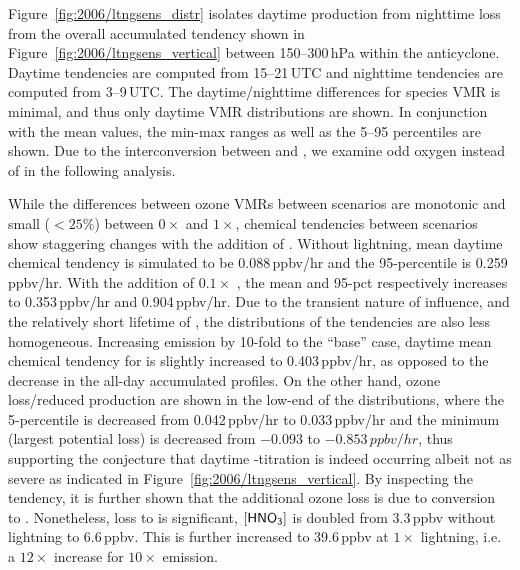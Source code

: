 Figure~\ref{fig:2006/ltngsens_distr} isolates daytime production from nighttime loss from the overall accumulated tendency shown
in Figure~\ref{fig:2006/ltngsens_vertical} between 150--300\,\unit{hPa} within the anticyclone. Daytime tendencies are computed
from 15--21\,\unit{UTC} and nighttime tendencies are computed from 3--9\,\unit{UTC}. The daytime/nighttime differences for species
VMR is minimal, and thus only daytime VMR distributions are shown. In conjunction with the mean values, the min-max ranges as well as the
5--95 percentiles are shown. Due to the interconversion between  and , we examine odd oxygen
 instead of  in the following analysis.

While the differences between ozone VMRs between scenarios are monotonic and small ($<25\%$) between $0\times$
and $1\times$, chemical tendencies between scenarios show staggering changes with the addition of {\lnox}. Without lightning,
mean daytime chemical tendency is simulated to be 0.088\,\unit{ppbv/hr} and the 95-percentile is 0.259\,\unit{ppbv/hr}. With the
addition of $0.1\times$ {\lnox}, the mean and 95-pct respectively increases to 0.353\,\unit{ppbv/hr} and 0.904\,\unit{ppbv/hr}. Due to
the transient nature of {\lnox} influence, and the relatively short lifetime of , the distributions of the tendencies are
also less homogeneous. Increasing {\lnox} emission by 10-fold to the ``base'' case, daytime mean chemical tendency for 
is slightly increased to 0.403\,\unit{ppbv/hr}, as opposed to the decrease in the all-day accumulated profiles. On the other hand, ozone
loss/reduced production are shown in the low-end of the distributions, where the 5-percentile is decreased from 0.042\,\unit{ppbv/hr}
to 0.033\,\unit{ppbv/hr} and the minimum (largest potential loss) is decreased from $-0.093$ to $-0.853\,\unit{ppbv/hr}$, thus 
supporting the conjecture that daytime -titration is indeed occurring albeit not as severe as indicated in
Figure~\ref{fig:2006/ltngsens_vertical}. By inspecting the  tendency, it is further shown that the additional ozone loss
is due to conversion to . Nonetheless, loss to  is significant, $[\chem{HNO_3}]$ is doubled from 3.3\,\unit{ppbv}
without lightning to 6.6\,\unit{ppbv}. This is further increased to 39.6\,\unit{ppbv} at $1\times$ lightning, i.e. a $12\times$ increase
for $10\times$ {\lnox} emission.


